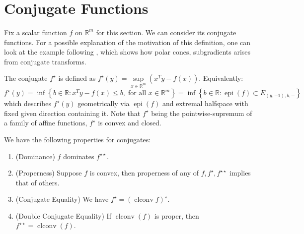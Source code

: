 \section{Conjugate Functions}
\label{sect:025}

\paragraph{}Fix a scalar function $f$ on $\mathbb{R}^m$ for this section. We can consider its conjugate functions. For a possible explanation of the motivation of this definition, one can look at the example following , which shows how polar cones, subgradients arises from conjugate transforms.

\begin{defn}[Conjugate]\label{defn:025-conjugate}
	The conjugate $f^\star$ is defined as $f^\star(y)=\underset{x\in \mathbb{R}^m}{\operatorname{sup}}\left(x^Ty-f(x)\right)$. Equivalently:
	\[
		f^\star(y)=\inf\left\{b\in \mathbb{R}:x^Ty-f(x)\leq b,\;\text{for all }x\in \mathbb{R}^m\right\} =\inf\left\{b\in \mathbb{R}:\operatorname{epi}(f)\subset E_{(y,-1),b,-}\right\}
	\]
	which describes $f^\star(y)$ geometrically via $\operatorname{epi}(f)$ and extremal halfspace with fixed given direction containing it.
	Note that $f^\star$ being the pointwise-supremum of a family of affine functions, $f^\star$ is convex and closed.
\end{defn}

\begin{prop}\label{prop:025-conjugacy-theorem}We have the following properties for conjugates:
	\begin{enumerate}[label=(\alph*)]
		\item (Dominance) $f$ dominates $f^{\star\star}$.
		\item (Properness) Suppose $f$ is convex, then properness of any of $f,f^{\star},f^{\star\star}$ implies that of others.
		\item (Conjugate Equality) We have $f^\star=(\operatorname{clconv}f)^\star$.
		\item (Double Conjugate Equality) If $\operatorname{clconv}(f)$ is proper, then $f^{\star\star}=\operatorname{clconv}(f)$.
	\end{enumerate}
\end{prop}

